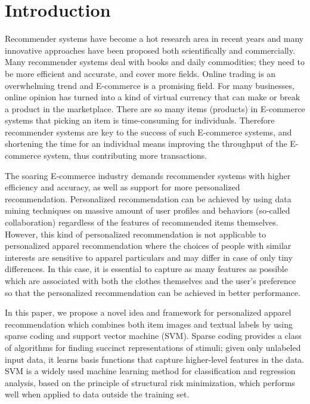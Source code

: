 \section{Introduction}\label{sec:intro}

Recommender systems have become a hot research area in recent years and 
  many innovative approaches have been proposed both scientifically and commercially. 
Many recommender systems deal with books and daily commodities; 
  they need to be more efficient and accurate, and cover more fields.
Online trading is an overwhelming trend and E-commerce is a promising field. 
For many businesses, online opinion has turned into a kind of virtual currency 
  that can make or break a product in the marketplace. 
There are so many items (products) in E-commerce systems that 
  picking an item is time-consuming for individuals.
Therefore recommender systems are key to the success of such E-commerce systems, 
  and shortening the time for an individual means improving the 
  throughput of the E-commerce system, thus contributing more transactions.

The soaring E-commerce industry demands recommender systems 
  with higher efficiency and accuracy, as well as support for more 
  personalized recommendation.
Personalized recommendation can be achieved by using data mining techniques on 
  massive amount of user profiles and behaviors (so-called collaboration) 
  regardless of the features of recommended items themselves. 
However, this kind of personalized recommendation is not applicable to 
  personalized apparel recommendation where the choices of people with similar interests 
  are sensitive to apparel particulars and may differ in case of only tiny differences. 
In this case, it is essential to capture as many features as possible 
  which are associated with both the clothes themselves and the user's preference 
  so that the personalized recommendation can be achieved in better performance. 

In this paper, we propose a novel idea and framework for personalized apparel recommendation
  which combines both item images and textual labels by using sparse coding and 
  support vector machine (SVM). 
Sparse coding provides a class of algorithms for finding succinct representations of stimuli; 
  given only unlabeled input data, it learns basis functions that capture higher-level features 
  in the data.
SVM is a widely used machine learning method for classification and regression analysis,
  based on the principle of structural risk minimization, which performs well when applied to 
  data outside the training set.

